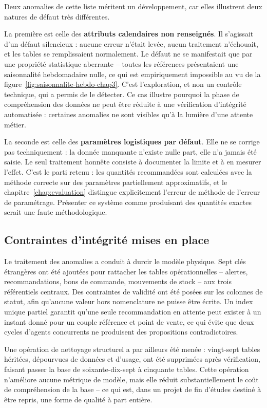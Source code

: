 Deux anomalies de cette liste méritent un développement, car elles illustrent deux natures de défaut très différentes.

La première est celle des \textbf{attributs calendaires non renseignés}. Il s'agissait d'un défaut silencieux : aucune erreur n'était levée, aucun traitement n'échouait, et les tables se remplissaient normalement. Le défaut ne se manifestait que par une propriété statistique aberrante -- toutes les références présentaient une saisonnalité hebdomadaire nulle, ce qui est empiriquement impossible au vu de la figure~\ref{fig:saisonnalite-hebdo-chap3}. C'est l'exploration, et non un contrôle technique, qui a permis de le détecter. Ce cas illustre pourquoi la phase de compréhension des données ne peut être réduite à une vérification d'intégrité automatisée : certaines anomalies ne sont visibles qu'à la lumière d'une attente métier.

La seconde est celle des \textbf{paramètres logistiques par défaut}. Elle ne se corrige pas techniquement : la donnée manquante n'existe nulle part, elle n'a jamais été saisie. Le seul traitement honnête consiste à documenter la limite et à en mesurer l'effet. C'est le parti retenu : les quantités recommandées sont calculées avec la méthode correcte sur des paramètres partiellement approximatifs, et le chapitre~\ref{chap:evaluation} distingue explicitement l'erreur de méthode de l'erreur de paramétrage. Présenter ce système comme produisant des quantités exactes serait une faute méthodologique.

\subsection{Contraintes d'intégrité mises en place}

Le traitement des anomalies a conduit à durcir le modèle physique. Sept clés étrangères ont été ajoutées pour rattacher les tables opérationnelles -- alertes, recommandations, bons de commande, mouvements de stock -- aux trois référentiels centraux. Des contraintes de validité ont été posées sur les colonnes de statut, afin qu'aucune valeur hors nomenclature ne puisse être écrite. Un index unique partiel garantit qu'une seule recommandation en attente peut exister à un instant donné pour un couple référence et point de vente, ce qui évite que deux cycles d'agents concurrents ne produisent des propositions contradictoires.

Une opération de nettoyage structurel a par ailleurs été menée : vingt-sept tables héritées, dépourvues de données et d'usage, ont été supprimées après vérification, faisant passer la base de soixante-dix-sept à cinquante tables. Cette opération n'améliore aucune métrique de modèle, mais elle réduit substantiellement le coût de compréhension de la base -- ce qui est, dans un projet de fin d'études destiné à être repris, une forme de qualité à part entière.

